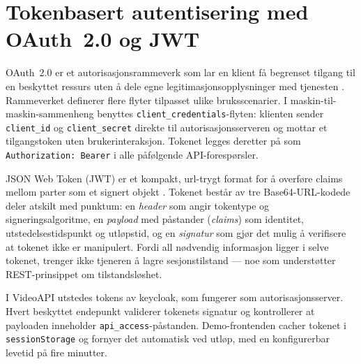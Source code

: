 


\section{Tokenbasert autentisering med OAuth~2.0 og JWT}
\label{sec:token-autentisering-oauth-jwt}
OAuth~2.0 er et autorisasjonsrammeverk som lar en klient få begrenset tilgang til en beskyttet ressurs uten å dele egne legitimasjonsopplysninger med tjenesten \cite{rfc6749}. Rammeverket definerer flere flyter tilpasset ulike bruksscenarier. I maskin-til-maskin-sammenheng benyttes \texttt{client\_credentials}-flyten: klienten sender \texttt{client\_id} og \texttt{client\_secret} direkte til autorisasjonsserveren og mottar et tilgangstoken uten brukerinteraksjon. Tokenet legges deretter på som \texttt{Authorization: Bearer} i alle påfølgende API-forespørsler.

JSON Web Token (JWT) er et kompakt, \gls{url}-trygt format for å overføre claims mellom parter som et signert objekt \cite{rfc7519}. Tokenet består av tre Base64-URL-kodede deler atskilt med punktum: en \emph{header} som angir tokentype og signeringsalgoritme, en \emph{payload} med påstander (\emph{claims}) som identitet, utstedelsestidspunkt og utløpstid, og en \emph{signatur} som gjør det mulig å verifisere at tokenet ikke er manipulert. Fordi all nødvendig informasjon ligger i selve tokenet, trenger ikke tjeneren å lagre sesjonstilstand — noe som understøtter REST-prinsippet om tilstandsløshet.

I VideoAPI utstedes tokens av \gls{keycloak}, som fungerer som autorisasjonsserver. Hvert beskyttet endepunkt validerer tokenets signatur og kontrollerer at payloaden inneholder \texttt{api\_access}-påstanden. Demo-frontenden cacher tokenet i \texttt{sessionStorage} og fornyer det automatisk ved utløp, med en konfigurerbar levetid på fire minutter.